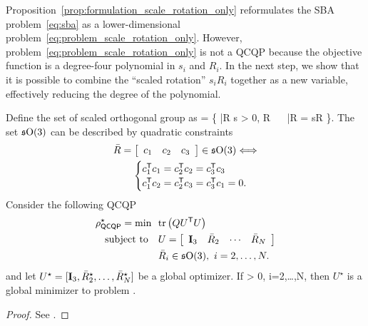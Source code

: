 Proposition~\ref{prop:formulation_scale_rotation_only} reformulates the SBA problem~\eqref{eq:sba} as a lower-dimensional problem~\eqref{eq:problem_scale_rotation_only}. However, problem~\eqref{eq:problem_scale_rotation_only} is not a QCQP because the objective function is a degree-four polynomial in $s_i$ and $R_i$. In the next step, we show that it is possible to combine the ``scaled rotation'' $s_i R_i$ together as a new variable, effectively reducing the degree of the polynomial.






\begin{proposition}\label{prop:qcqp}
    Define the set of scaled orthogonal group as
    \bea \label{eq:sOthreedef}
    \sOthree = \{ \bar{R} \in {} \mid \exists s > 0, R \in \Othree~~ \bar{R} = sR \}.
    \eea 
    The set $\sOthree$ can be described by quadratic constraints
    \begin{equation} \label{eq:sOthreequadratic}
    \begin{split}
        \bar{R} = \bmat{ccc} c_1 & c_2 & c_3 \emat \in \sOthree \Longleftrightarrow \\ \begin{cases}
            c_1\tran c_1 = c_2\tran c_2 = c_3\tran c_3 \\
            c_1\tran c_2 = c_2\tran c_3 = c_3\tran c_1 = 0 .
        \end{cases}
    \end{split}
    \end{equation} 
    Consider the following QCQP
    \begin{subequations}\label{eq:problem-qcqp}
        \begin{align} 
            \rho_{\qcqp}^\star = \min  &\ \ \trace{Q U\tran U}  \\
            \subject & \ \ U = \bmat{cccc} \eye_3 & \bar{R}_2 & \cdots & \bar{R}_N \emat\\
            &\ \ \bar{R}_i \in \sOthree, ~i = 2,\dots,N.
        \end{align}
    \end{subequations}
    and let $U^\star = [\eye_3, \bar{R}_2^\star, \dots,\bar{R}_N^\star]$ be a global optimizer. If 
    \bea \label{eq:determinant}
     > 0, i=2,\dots,N,
    \eea 
    then $U^\star$ is a global minimizer to problem .
\end{proposition}
\begin{proof}
    See .
\end{proof}

